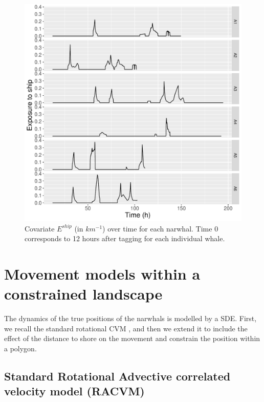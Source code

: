 \documentclass[aoas]{imsart}
\theoremstyle{definition}
\theoremstyle{remark}
\theoremstyle{remark}
\newcommand {\1}{\mathbb{1}}
\begin{document}
\begin{figure}[ht!]
		\centering
		\includegraphics[scale=0.50]{images/data_exploration/realExpShip_through_time.pdf}
	
	\caption{Covariate $E^{ship}$ (in $km^{-1}$) over time for each narwhal. Time 0 corresponds to 12 hours after tagging for each individual whale.}  
	\label{fig: realexpthroughtime}
\end{figure}



\section{Movement models within a constrained landscape}

The dynamics of the true positions of the narwhals is modelled by a SDE. First, we recall the standard rotational CVM \citep{gurarie_correlated_2017}, and then we extend it to include the effect of the distance to shore on the movement and constrain the position within a polygon.


\subsection{Standard Rotational Advective correlated velocity model (RACVM)}
\label{section: RACVM}
\mbox{}\\
\end{document}
